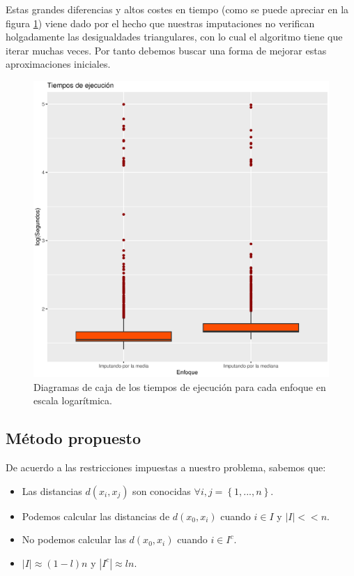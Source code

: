 \documentclass[12pt]{report} %
\theoremstyle{definition}
\begin{document}
{Estas grandes diferencias y altos costes en tiempo (como se puede apreciar en la figura \ref{fig:MD3}) viene dado por el hecho que nuestras imputaciones no verifican holgadamente las desigualdades triangulares, con lo cual el algoritmo tiene que iterar muchas veces. Por tanto debemos buscar una forma de mejorar estas aproximaciones iniciales.\\

\begin{figure}[H]
	\centering
	\includegraphics[scale=0.5]{imagenes/tf_imputation_mean_and_median_tiempo.eps}
	\caption{Diagramas de caja de los tiempos de ejecución para cada enfoque en escala logarítmica.}
	\label{fig:MD3}
\end{figure}

\subsection{Método propuesto}

De acuerdo a las restricciones impuestas a nuestro problema, sabemos que:

\begin{itemize}
	\item Las distancias $d(x_i,x_j)$ son conocidas $\forall i,j=\left\lbrace 1,...,n\right\rbrace$.
	\item Podemos calcular las distancias de $d(x_0,x_i)$ cuando $i \in I$ y $\left| I \right| << n$.
	\item No podemos calcular las $d(x_0,x_i)$ cuando $i \in I^c$.
	\item $\left| I \right| \approx (1-l)n$ y $\left| I^c \right| \approx ln$.  
\end{itemize}

}
\end{document}
